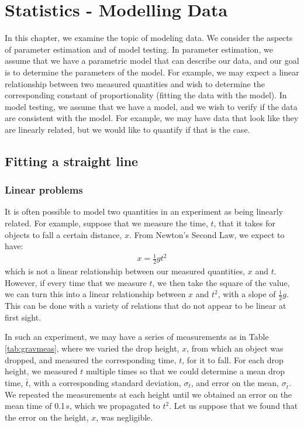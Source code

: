 \chapter{Statistics - Modelling Data}
\label{Chap:statModelData}
In this chapter, we examine the topic of modeling data. We consider the aspects of parameter estimation and of model testing. In parameter estimation, we assume that we have a parametric model that can describe our data, and our goal is to determine the parameters of the model. For example, we may expect a linear relationship between two measured quantities and wish to determine the corresponding constant of proportionality (fitting the data with the model). In model testing, we assume that we have a model, and we wish to verify if the data are consistent with the model. For example, we may have data that look like they are linearly related, but we would like to quantify if that is the case. 
 

\section{Fitting a straight line}
\subsection{Linear problems}
It is often possible to model two quantities in an experiment as being linearly related. For example, suppose that we measure the time, $t$, that it takes for objects to fall a certain distance, $x$. From Newton's Second Law, we expect to have:
\begin{align}
x = \frac{1}{2}gt^2
\end{align}
which is not a linear relationship between our measured quantities, $x$ and $t$. However, if every time that we measure $t$, we then take the square of the value, we can turn this into a linear relationship between $x$ and $t^2$, with a slope of $\frac{1}{2}g$. This can be done with a variety of relations that do not appear to be linear at first sight. 

In such an experiment, we may have a series of measurements as in Table \ref{tab:gravmeas}, where we varied the drop height, $x$, from which an object was dropped, and measured the corresponding time, $t$, for it to fall. For each drop height, we measured $t$ multiple times so that we could determine a mean drop time, $\bar t$, with a corresponding standard deviation, $\sigma_t$, and error on the mean, $\sigma_{\bar t}$. We repeated the measurements at each height until we obtained an error on the mean time of 0.1\,s, which we propagated to $t^2$. Let us suppose that we found that the error on the height, $x$, was negligible. 

